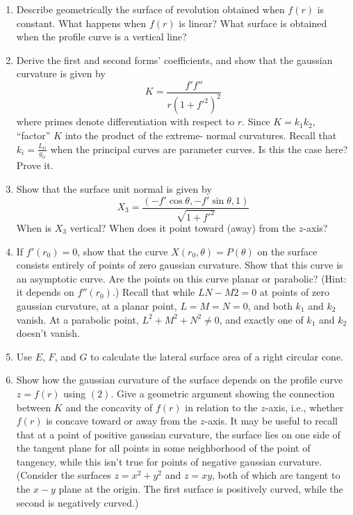 \documentclass{book}
\begin{document}
\begin{enumerate}[1.]
  \item Describe geometrically the surface of revolution obtained when $f(r)$ is constant. What happens when $f(r)$ is linear? What surface is obtained when the profile curve is a vertical line?
  \item Derive the first and second forms' coefficients, and show that the gaussian curvature is given by
    \begin{equation}
      K = \frac{ f' f'' }{ r (1 + f'^{2})^{2} }
    \end{equation}
    where primes denote differentiation with respect to $r$. Since $K = k_{1} k_{2}$, ``factor'' $K$ into the product of the extreme- normal curvatures. Recall that $k_{i} = \frac{L_{ii}}{g_{ii}}$ when the principal curves are parameter curves. Is this the case here? Prove it.
  \item Show that the surface unit normal is given by
    \begin{equation}
      X_{3} = \frac{(- f' \cos \theta, - f' \sin \theta, 1)}{ \sqrt{1+f'^{2}} }
    \end{equation}
    When is $X_{3}$ vertical? When does it point toward (away) from the $z$-axis?
  \item If $f'(r_{0}) = 0$, show that the curve $X(r_{0},\theta) = P(\theta)$ on the surface consists entirely of points of zero gaussian curvature. Show that this curve is an asymptotic curve. Are the points on this curve planar or parabolic? (Hint: it depends on $f''(r_{0})$.) Recall that while $LN - M2 = 0$ at points of zero gaussian curvature, at a planar point, $L = M = N = 0$, and both $k_{1}$ and $k_{2}$ vanish. At a parabolic point, $L^{2} + M^{2} + N^{2} \neq 0$, and exactly one of $k_{1}$ and $k_{2}$ doesn't vanish.
  \item Use $E$, $F$, and $G$ to calculate the lateral surface area of a right circular cone.
  \item Show how the gaussian curvature of the surface depends on the profile curve $z = f(r)$ using $(2)$. Give a geometric argument showing the connection between $K$ and the concavity of $f(r)$ in relation to the $z$-axis, i.e., whether $f(r)$ is concave toward or away from the $z$-axis. It may be useful to recall that at a point of positive gaussian curvature, the surface lies on one side of the tangent plane for all points in some neighborhood of the point of tangency, while this isn't true for points of negative gaussian curvature. (Consider the surfaces $z = x^{2} + y^{2}$ and $z = xy$, both of which are tangent to the $x-y$ plane at the origin. The first surface is positively curved, while the second is negatively curved.)

\end{enumerate}
\end{document}
